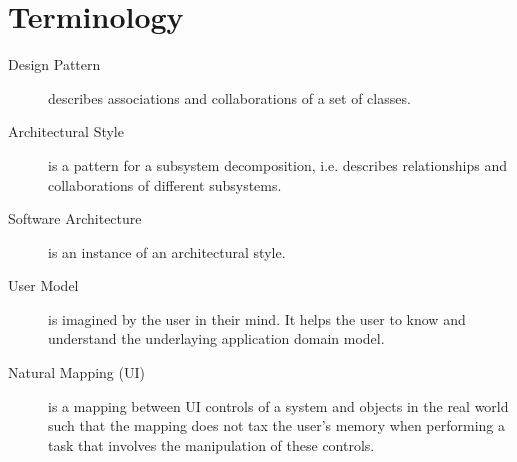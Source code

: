 
\section{Terminology}
\begin{description}

  \item[Design Pattern] describes associations and collaborations of a set of classes.

  \item[Architectural Style] is a pattern for a subsystem decomposition, i.e. describes relationships and collaborations of different subsystems.

  \item[Software Architecture] is an instance of an architectural style.

  \item[User Model] is imagined by the user in their mind.
  It helps the user to know and understand the underlaying application domain model.

  \item[Natural Mapping (UI)] is a mapping between UI controls of a system and objects in the real world such that the mapping does not tax the user's memory when performing a task that involves the manipulation of these controls.
\end{description}
